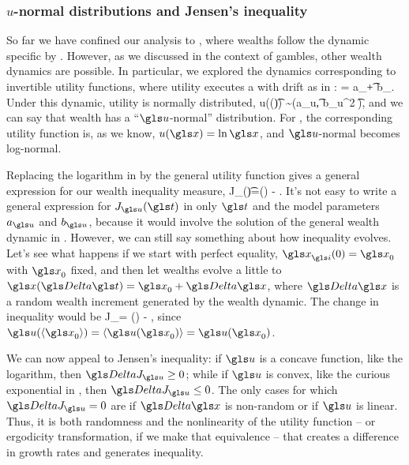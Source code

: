 \subsubsection{$u$-normal distributions and Jensen's inequality}
So far we have confined our analysis to \GBM, where wealths follow the dynamic specific by . However, as we discussed in the context of gambles, other wealth dynamics are possible. In particular, we explored the dynamics corresponding to invertible utility functions, where utility executes a \BM with drift as in :
\be
\gd\gu = a_\gu \gd\t + b_\gu \gd\gW.
\ee
Under this dynamic, utility is normally distributed,
\be
u(\x(\t)) \sim \mathcal{\N}\left(a_u\t, {b_u}^2 \t\right),
\ee
and we can say that wealth has a ``$\gu$-normal'' distribution. For \GBM, the corresponding utility function is, as we know, $u(\x)=\ln \x$, and $\gu$-normal becomes log-normal.

Replacing the logarithm in  by the general utility function gives a general expression for our wealth inequality measure,
\be
J_\gu(\t)=\gu(\ave{\x(\t)}) - \ave{\gu(\x(\t))}.
\ee
It's not easy to write a general expression for $J_\gu(\t)$ in only $\t$ and the model parameters $a_\gu$ and $b_\gu$, because it would involve the solution of the general wealth dynamic in . However, we can still say something about how inequality evolves. Let's see what happens if we start with perfect equality, $\x_\gi(0)=\x_0$ with $\x_0$ fixed, and then let wealths evolve a little to $\x(\D \t)=\x_0+\D \x$, where $\D \x$ is a random wealth increment generated by the wealth dynamic. The change in inequality would be
\be
\D J_\gu = \gu() - ,
\ee
since $\gu(\ave{\x_0})=\ave{\gu(\x_0)}=\gu(\x_0)$.

We can now appeal to Jensen's inequality: if $\gu$ is a concave function, like the logarithm, then $\D J_\gu \geq 0$; while if $\gu$ is convex, like the curious exponential in , then $\D J_\gu \leq 0$. The only cases for which $\D J_\gu=0$ are if $\D \x$ is non-random or if $\gu$ is linear. Thus, it is both randomness and the nonlinearity of the utility function -- or ergodicity transformation, if we make that equivalence -- that creates a difference in growth rates and generates inequality.


